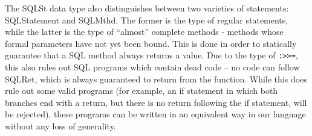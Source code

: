     The SQLSt data type also distinguishes between two varieties of statements:
    SQLStatement and SQLMthd. The former is the type of regular statements, 
    while
    the latter is the type of ``almost'' complete methods - methods whose formal
    parameters have not yet been bound. This is done in order to statically
    guarantee that a SQL method always returns a value. Due to the type of
    \lstinline{:>>=}, this also rules out SQL programs which contain dead code 
    -- no
    code can follow SQLRet, which is always guaranteed to return from the 
    function.
    While this does rule out some valid programs (for example, an if statement 
    in
    which both branches end with a return, but there is no return following the 
    if
    statement, will be rejected), these programs can be written in an equivalent
    way in our language without any loss of generality.    
